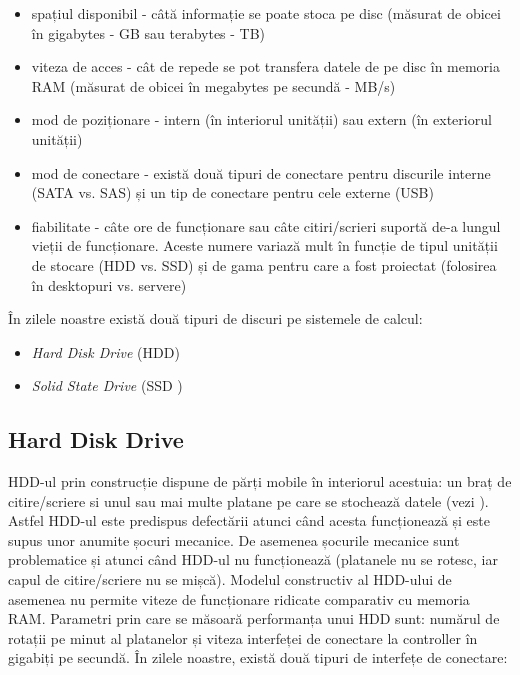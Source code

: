 \begin{itemize}
	\item spațiul disponibil - câtă informație se poate stoca pe disc
		(măsurat de obicei în gigabytes - GB sau terabytes
		 - TB)
	\item viteza de acces - cât de repede se pot transfera datele de pe disc
		în memoria RAM (măsurat de obicei în megabytes pe secundă - MB/s)
	\item mod de poziționare - intern (în interiorul unității) sau extern
		(în exteriorul unității)
	\item mod de conectare - există două tipuri de conectare pentru
		discurile interne (SATA vs. SAS) și un tip de conectare pentru cele externe (USB)
	\item fiabilitate - câte ore de funcționare sau câte citiri/scrieri
		suportă de-a lungul vieții de funcționare. Aceste numere variază
		mult în funcție de tipul unității de stocare (HDD vs. SSD) și de
		gama pentru care a fost proiectat (folosirea în desktopuri vs.
		servere)
\end{itemize}

În zilele noastre există două tipuri de discuri pe sistemele de calcul:

\begin{itemize}
  \item \textit{Hard Disk Drive} (HDD)
  \item \textit{Solid State Drive} (SSD )
\end{itemize}

\subsection{Hard Disk Drive}
\label{sec:storage:type:hdd}

HDD-ul prin construcție dispune de părți mobile în interiorul acestuia: un braț
de citire/scriere si unul sau mai multe platane pe care se stochează datele
(vezi ). Astfel HDD-ul este predispus defectării atunci când acesta
funcționează și este supus unor anumite șocuri mecanice. De asemenea șocurile
mecanice sunt problematice și atunci când HDD-ul nu funcționează (platanele nu
se rotesc, iar capul de citire/scriere nu se mișcă). Modelul constructiv al
HDD-ului de asemenea nu permite viteze de funcționare ridicate comparativ cu
memoria RAM. Parametri prin care se măsoară performanța unui HDD sunt: numărul
de rotații pe minut al platanelor și viteza interfeței de conectare la
controller în gigabiți pe secundă. În zilele noastre, există două tipuri de
interfețe de conectare:

